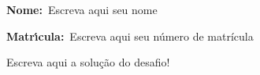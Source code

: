 \begin{center}
\end{center}

\vspace{0.2in}

{\textbf{Nome:}\ Escreva aqui seu nome}

\vspace{0.1in}

\textbf{Matr{\'\i}cula:}\ Escreva aqui seu número de matrícula

\vspace{0.3in}

Escreva aqui a solução do desafio!